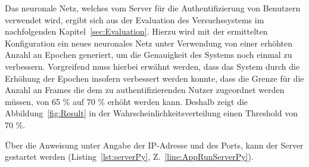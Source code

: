 Das neuronale Netz, welches vom Server für die Authentifizierung von Benutzern verwendet wird, ergibt sich aus der Evaluation des Versuchssystems im nachfolgenden Kapitel~\ref{sec:Evaluation}.
Hierzu wird mit der ermittelten Konfiguration ein neues neuronales Netz unter Verwendung von einer erhöhten Anzahl an Epochen generiert, um die Genauigkeit des Systems noch einmal zu verbessern.
Vorgreifend muss hierbei erwähnt werden, dass das System durch die Erhöhung der Epochen insofern verbessert werden konnte, dass die Grenze für die Anzahl an Frames die dem zu authentifizierenden Nutzer zugeordnet werden müssen, von 65 \% auf 70 \% erhöht werden kann.
Deshalb zeigt die Abbildung~\ref{fig:Result} in der Wahrscheinlichkeitsverteilung einen Threshold von 70 \%.

Über die Anweisung  unter Angabe der IP-Adresse und des Ports, kann der Server gestartet werden (Listing~\ref{lst:serverPy}, Z.~\ref{line:AppRunServerPy}).